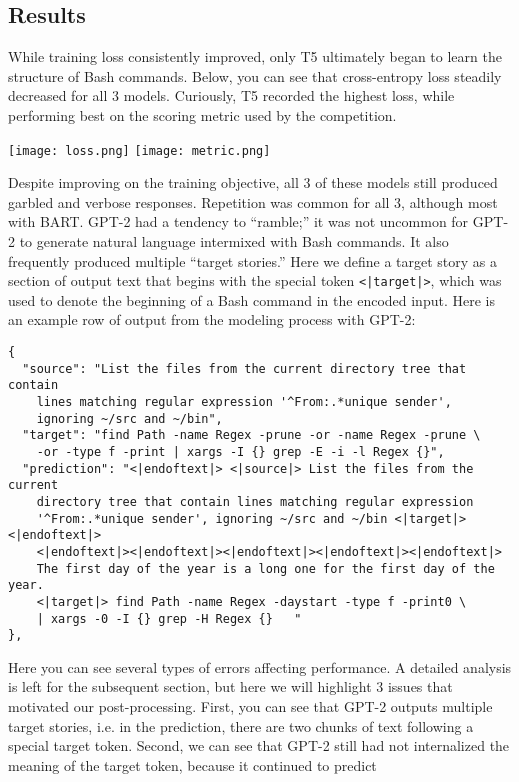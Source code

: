 \documentclass{article}
\begin{document}
\subsection{Results}
While training loss consistently improved, only T5 ultimately began to
learn the structure of Bash commands. Below, you can see that cross-entropy
loss steadily decreased for all 3 models. Curiously, T5 recorded the highest
loss, while performing best on the scoring metric used by the competition.
\begin{center}
	\texttt{[image: loss.png]}
	\texttt{[image: metric.png]}
\end{center}
Despite improving on the training objective, all 3 of these models still
produced garbled and verbose responses. Repetition was common for all 3,
although most with BART. GPT-2 had a tendency to ``ramble;'' it was not uncommon
for GPT-2 to generate natural language intermixed with Bash commands. It also
frequently produced multiple ``target stories.'' Here we define a target story
as a section of output text that begins with the special token
\texttt{<|target|>}, which was used to denote the beginning of a Bash command
in the encoded input. Here is an example row of output from the modeling process with GPT-2:
\begin{verbatim}
{
  "source": "List the files from the current directory tree that contain
    lines matching regular expression '^From:.*unique sender',
    ignoring ~/src and ~/bin",
  "target": "find Path -name Regex -prune -or -name Regex -prune \
    -or -type f -print | xargs -I {} grep -E -i -l Regex {}",
  "prediction": "<|endoftext|> <|source|> List the files from the current
    directory tree that contain lines matching regular expression
    '^From:.*unique sender', ignoring ~/src and ~/bin <|target|><|endoftext|>
    <|endoftext|><|endoftext|><|endoftext|><|endoftext|><|endoftext|>
    The first day of the year is a long one for the first day of the year.
    <|target|> find Path -name Regex -daystart -type f -print0 \
    | xargs -0 -I {} grep -H Regex {}   "
},
\end{verbatim}
Here you can see several types of errors affecting performance. A detailed
analysis is left for the subsequent section, but here we will highlight 3
issues that motivated our post-processing. First, you can see that GPT-2 outputs
multiple target stories, i.e. in the prediction, there are two chunks of text
following a special target token. Second, we can see that GPT-2 still had
not internalized the meaning of the target token, because it continued to predict
\end{document}
